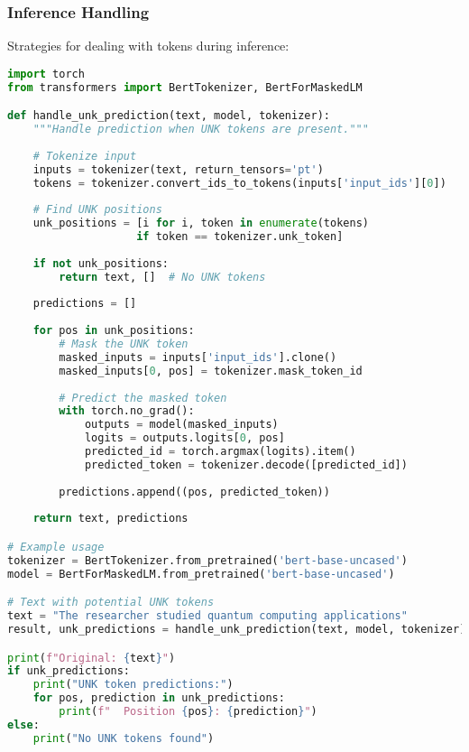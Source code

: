 \subsubsection{Inference Handling}
Strategies for dealing with \unk{} tokens during inference:

\begin{example}
\begin{lstlisting}[language=Python]
import torch
from transformers import BertTokenizer, BertForMaskedLM

def handle_unk_prediction(text, model, tokenizer):
    """Handle prediction when UNK tokens are present."""
    
    # Tokenize input
    inputs = tokenizer(text, return_tensors='pt')
    tokens = tokenizer.convert_ids_to_tokens(inputs['input_ids'][0])
    
    # Find UNK positions
    unk_positions = [i for i, token in enumerate(tokens) 
                    if token == tokenizer.unk_token]
    
    if not unk_positions:
        return text, []  # No UNK tokens
    
    predictions = []
    
    for pos in unk_positions:
        # Mask the UNK token
        masked_inputs = inputs['input_ids'].clone()
        masked_inputs[0, pos] = tokenizer.mask_token_id
        
        # Predict the masked token
        with torch.no_grad():
            outputs = model(masked_inputs)
            logits = outputs.logits[0, pos]
            predicted_id = torch.argmax(logits).item()
            predicted_token = tokenizer.decode([predicted_id])
            
        predictions.append((pos, predicted_token))
    
    return text, predictions

# Example usage
tokenizer = BertTokenizer.from_pretrained('bert-base-uncased')
model = BertForMaskedLM.from_pretrained('bert-base-uncased')

# Text with potential UNK tokens
text = "The researcher studied quantum computing applications"
result, unk_predictions = handle_unk_prediction(text, model, tokenizer)

print(f"Original: {text}")
if unk_predictions:
    print("UNK token predictions:")
    for pos, prediction in unk_predictions:
        print(f"  Position {pos}: {prediction}")
else:
    print("No UNK tokens found")
\end{lstlisting}
\end{example}

